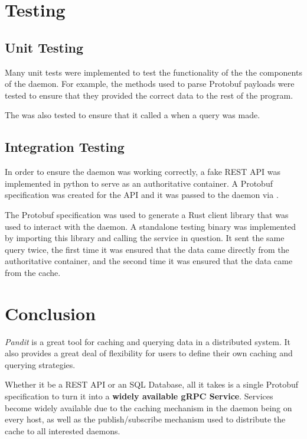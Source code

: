 \documentclass[a4paper,12pt]{report}
\begin{document}
\section{Testing}
\subsection{Unit Testing}
Many unit tests were implemented to test the functionality of the the components of the daemon.
For example, the \textit{} methods used to parse Protobuf payloads were tested to ensure that they provided the correct
data to the rest of the program.

The \textit{} was also tested to ensure that it called a \textit{} when a query was made.

\subsection{Integration Testing}
In order to ensure the daemon was working correctly, a fake REST API was implemented in python to serve as an authoritative container.
A Protobuf specification was created for the API and it was passed to the daemon via \textit{}.

The Protobuf specification was used to generate a Rust client library \cite{codegen} that was used to interact with the daemon.
A standalone testing binary was implemented by importing this library and calling the service in question.
It sent the same query twice, the first time it was ensured that the data came directly from the authoritative container, and the second time it was
ensured that the data came from the cache.

\section{Conclusion}
\textit{Pandit} is a great tool for caching and querying data in a distributed system.
It also provides a great deal of flexibility for users to define their own caching and querying strategies.

Whether it be a REST API or an SQL Database, all it takes is a single Protobuf specification \cite{protobufs} to turn it into a
\textbf{widely available gRPC \cite{grpc} Service}. Services become widely available due to the caching mechanism in the daemon being on every host,
as well as the publish/subscribe mechanism used to distribute the cache to all interested daemons.
\end{document}
